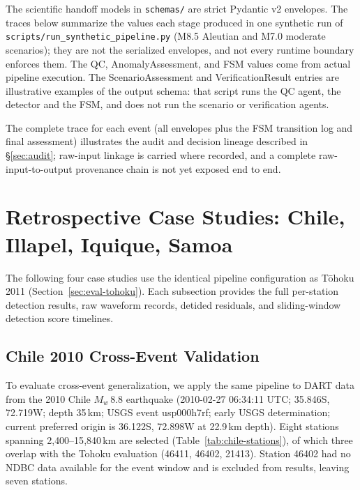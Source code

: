 \documentclass{article}
\begin{document}
The scientific handoff models in \texttt{schemas/} are strict Pydantic
v2 envelopes.  The traces below summarize the values each stage
produced in one synthetic run of
\texttt{scripts/run\_synthetic\_pipeline.py} (M8.5 Aleutian and M7.0
moderate scenarios); they are not the serialized envelopes, and not
every runtime boundary enforces them.
The QC, AnomalyAssessment, and FSM values come from actual pipeline
execution.  The ScenarioAssessment and VerificationResult entries are
illustrative examples of the output schema: that script runs the QC
agent, the detector and the FSM, and does not run the scenario or
verification agents.



The complete trace for each event (all envelopes plus the
FSM transition log and final assessment) illustrates the audit and
decision lineage described in \S\ref{sec:audit}; raw-input linkage
is carried where recorded, and a complete raw-input-to-output
provenance chain is not yet exposed end to end.


\newpage
\renewcommand{\thefigure}{G.\arabic{figure}}
\setcounter{figure}{0}
\renewcommand{\thetable}{G.\arabic{table}}
\setcounter{table}{0}
\section{Retrospective Case Studies: Chile, Illapel, Iquique, Samoa}
\label{sec:appendix-case-studies}

The following four case studies use the identical pipeline configuration
as T\={o}hoku 2011 (Section~\ref{sec:eval-tohoku}).  Each subsection
provides the full per-station detection results, raw waveform records,
detided residuals, and sliding-window detection score timelines.

\FloatBarrier
\subsection{Chile 2010 Cross-Event Validation}
\label{sec:eval-chile}

To evaluate cross-event generalization, we apply the same pipeline to
DART data from the 2010 Chile $M_w$\,8.8 earthquake
(2010-02-27 06:34:11 UTC; 35.846\textdegree S, 72.719\textdegree W;
depth 35\,km; USGS event usp000h7rf; early USGS determination;
current preferred origin is 36.122\textdegree S, 72.898\textdegree W
at 22.9\,km depth).
Eight stations spanning 2{,}400--15{,}840\,km are selected
(Table~\ref{tab:chile-stations}), of which three overlap with the
Tohoku evaluation (46411, 46402, 21413).
Station 46402 had no NDBC data available for the event window and is
excluded from results, leaving seven stations.
\end{document}
